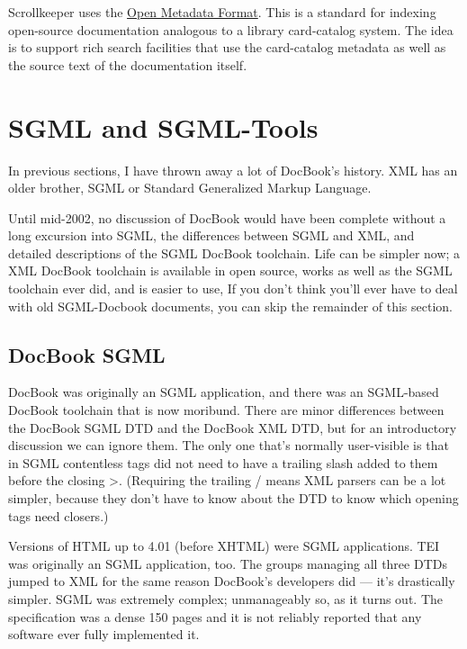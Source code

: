 \documentclass[pdftex,english,a4paper,10pt]{infocom}
\begin{document}
Scrollkeeper uses the \href{http://www.ibiblio.org/osrt/omf/}{ Open Metadata Format}.
This is a standard for indexing open-source documentation analogous to
a library card-catalog system.  The idea is to support rich search
facilities that use the card-catalog metadata as well as the source 
text of the documentation itself.

\section{SGML and SGML-Tools}
\label{id2717159}\hypertarget{id2717159}{}%

In previous sections, I have thrown away a lot of DocBook's
history.  XML has an older brother,
SGML or Standard Generalized
Markup Language.

Until mid-2002, no discussion of DocBook would have been
complete without a long excursion into SGML, the differences between
SGML and XML, and detailed descriptions of the SGML DocBook toolchain.
Life can be simpler now; a XML DocBook toolchain is available in open
source, works as well as the SGML toolchain ever did, and is easier to
use, If you don't think you'll ever have to deal with old SGML-Docbook
documents, you can skip the remainder of this section.
\subsection{DocBook SGML}
\label{id2717193}\hypertarget{id2717193}{}%

DocBook was originally an SGML application, and there was an
SGML-based DocBook toolchain that is now moribund.  There are minor
differences between the DocBook SGML DTD and the DocBook XML DTD, but
for an introductory discussion we can ignore them. The only one that's
normally user-visible is that in SGML contentless tags did not need to
have a trailing slash added to them before the closing \textgreater{}.
(Requiring the trailing / means XML parsers can be a lot simpler,
because they don't have to know about the DTD to know which opening
tags need closers.)

Versions of HTML up to 4.01 (before XHTML) were SGML
applications.  TEI was originally an SGML application, too.  The
groups managing all three DTDs jumped to XML for the same reason
DocBook's developers did --- it's drastically simpler.  SGML was
extremely complex; unmanageably so, as it turns out.  The
specification was a dense 150 pages and it is not reliably reported
that any software ever fully implemented it.
\end{document}
